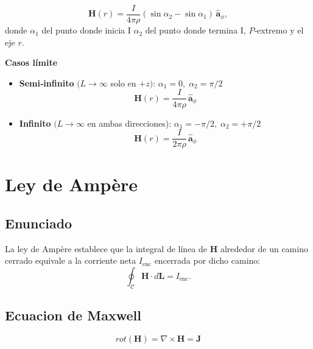 \documentclass[11pt]{article}
\begin{document}
\[
\mathbf{H}(r)=
\frac{I}{4\pi {\rho}}\left(
  \sin\alpha_{2}-\sin\alpha_{1}
\right)\,\hat{\boldsymbol{a}}_{\phi},
\]
donde
\(\alpha_{1}\) del punto donde inicia I \(\alpha_{2}\) del punto donde termina I, \(P\)‑extremo y el eje \(r\).

\textbf{Casos límite}
\begin{itemize}
  \item {\bf Semi‑infinito} \((L\to\infty\) solo en \(+z)\):
        \(\alpha_{1}=0,\;\alpha_{2}=\pi/2\)
        \[
        \boxed{\mathbf{H}(r)=\dfrac{I}{4\pi {\rho}}\,\hat{\boldsymbol{a}}_{\phi}}
        \]
  \item {\bf Infinito} \((L\to\infty\) en ambas direcciones):
        \(\alpha_{1}=-\pi/2,\;\alpha_{2}=+\pi/2\)
        \[
        \boxed{\mathbf{H}(r)=\dfrac{I}{2\pi {\rho}}\,\hat{\boldsymbol{a}}_{\phi}}
        \]
\end{itemize}

\section{Ley de Ampère}
\subsection*{Enunciado}
La ley de Ampère establece que la integral de línea de \(\mathbf{H}\)
alrededor de un camino cerrado equivale a la corriente neta \(I_{\mathrm{enc}}\)
encerrada por dicho camino:
\[
\oint_{\mathcal{C}}\mathbf{H}\cdot d\mathbf{L}= I_{\mathrm{enc}}.
\]

\subsection*{Ecuacion de Maxwell}
\[
rot(\mathbf{H})=\nabla \times \mathbf{H} = \mathbf{J}
\]

\end{document}
